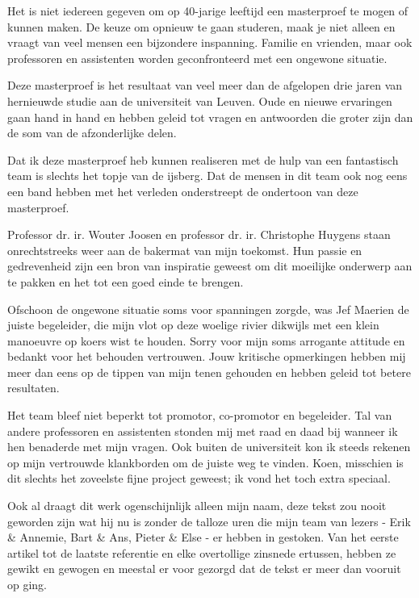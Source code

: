 
\begin{preface}

Het is niet iedereen gegeven om op 40-jarige leeftijd een masterproef te mogen
of kunnen maken. De keuze om opnieuw te gaan studeren, maak je niet alleen en
vraagt van veel mensen een bijzondere inspanning. Familie en vrienden, maar ook
professoren en assistenten worden geconfronteerd met een ongewone situatie.

Deze masterproef is het resultaat van veel meer dan de afgelopen drie jaren van
hernieuwde studie aan de universiteit van Leuven. Oude en nieuwe ervaringen
gaan hand in hand en hebben geleid tot vragen en antwoorden die groter zijn dan
de som van de afzonderlijke delen.

Dat ik deze masterproef heb kunnen realiseren met de hulp van een fantastisch
team is slechts het topje van de ijsberg. Dat de mensen in dit team ook nog
eens een band hebben met het verleden onderstreept de ondertoon van deze
masterproef.

Professor dr. ir. Wouter Joosen en professor dr. ir. Christophe Huygens staan
onrechtstreeks weer aan de bakermat van mijn toekomst. Hun passie en
gedrevenheid zijn een bron van inspiratie geweest om dit moeilijke onderwerp
aan te pakken en het tot een goed einde te brengen.

Ofschoon de ongewone situatie soms voor spanningen zorgde, was Jef Maerien de
juiste begeleider, die mijn vlot op deze woelige rivier dikwijls met een klein
manoeuvre op koers wist te houden. Sorry voor mijn soms arrogante attitude en
bedankt voor het behouden vertrouwen. Jouw kritische opmerkingen hebben mij
meer dan eens op de tippen van mijn tenen gehouden en hebben geleid tot betere
resultaten.

Het team bleef niet beperkt tot promotor, co-promotor en begeleider. Tal van
andere professoren en assistenten stonden mij met raad en daad bij wanneer ik
hen benaderde met mijn vragen. Ook buiten de universiteit kon ik steeds rekenen
op mijn vertrouwde klankborden om de juiste weg te vinden. Koen, misschien is
dit slechts het zoveelste fijne project geweest; ik vond het toch extra
speciaal.

Ook al draagt dit werk ogenschijnlijk alleen mijn naam, deze tekst zou nooit
geworden zijn wat hij nu is zonder de talloze uren die mijn team van lezers -
Erik \& Annemie, Bart \& Ans, Pieter \& Else - er hebben in gestoken. Van het
eerste artikel tot de laatste referentie en elke overtollige zinsnede ertussen,
hebben ze gewikt en gewogen en meestal er voor gezorgd dat de tekst er meer dan
vooruit op ging.


\end{preface}
